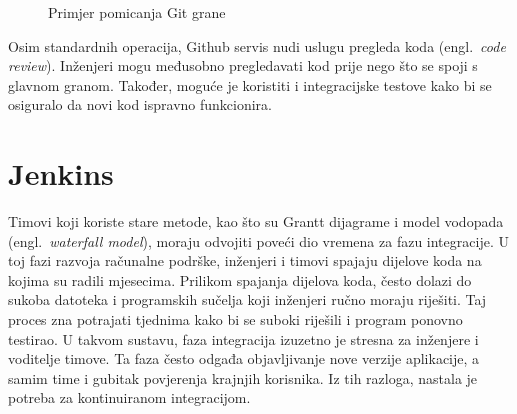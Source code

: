 \begin{figure}[h]
    \centering

    \caption{Primjer pomicanja Git grane}%
    \label{fig:02gitexample2}
\end{figure}

Osim standardnih operacija, Github servis nudi uslugu pregleda koda (engl.~\textit{code review}).
Inženjeri mogu međusobno pregledavati kod prije nego što se spoji s glavnom granom. Također, moguće
je koristiti i integracijske testove kako bi se osiguralo da novi kod ispravno funkcionira.

\section{Jenkins}
Timovi koji koriste stare metode, kao što su Grantt dijagrame i model vodopada
(engl.~\textit{waterfall model}), moraju odvojiti poveći dio vremena za fazu integracije. U toj fazi
razvoja računalne podrške, inženjeri i timovi spajaju dijelove koda na kojima su radili mjesecima.
Prilikom spajanja dijelova koda, često dolazi do sukoba datoteka i programskih sučelja koji
inženjeri ručno moraju riješiti. Taj proces zna potrajati tjednima kako bi se suboki riješili i
program ponovno testirao. U takvom sustavu, faza integracija izuzetno je stresna za inženjere i
voditelje timove. Ta faza često odgađa objavljivanje nove verzije aplikacije, a samim time i gubitak
povjerenja krajnjih korisnika. Iz tih razloga, nastala je potreba za kontinuiranom integracijom.

